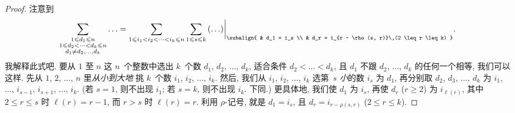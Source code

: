 \begin{proof}
    注意到
    \begin{align*}
        \sum_{\substack{
        1 \leq d_1 \leq n                              \\
        1 \leq d_2 < \dots < d_k \leq n                \\
                d_1 \neq d_2,\dots,d_k
            }} {\dots}
        =
        \sum_{1 \leq i_1 < i_2 < \dots < i_k \leq n}
        { \sum_{1 \leq s \leq k}
        { {({\dots})}\bigg|_{
        \subalign{
         & d_1 = i_s                                   \\
         & d_r = i_{r - \rho(s, r)}\,(2 \leq r \leq k)
        }
        }}}.
    \end{align*}
    我解释此式吧.
    要从 \(1\) 至 \(n\) 这 \(n\)~个整数中选出 \(k\)~个数
    \(d_1\), \(d_2\), \(\dots\), \(d_k\),
    适合条件 \(d_2 < \dots < d_k\),
    且 \(d_1\) 不跟 \(d_2\), \(\dots\), \(d_k\) 的任何一个相等,
    我们可以这样.
    先从 \(1\), \(2\), \(\dots\), \(n\) 里\emph{从小到大地}%
    挑 \(k\)~个数 \(i_1\), \(i_2\), \(\dots\), \(i_k\).
    然后, 我们从 \(i_1\), \(i_2\), \(\dots\), \(i_k\)
    选第~\(s\) \emph{小}的数 \(i_s\) 为 \(d_1\),
    再分别取 \(d_2\), \(d_3\), \(\dots\), \(d_k\)
    为
    \(i_1\), \(\dots\), \(i_{s-1}\),
    \(i_{s+1}\), \(\dots\), \(i_{k}\).
    (若 \(s = 1\), 则不出现 \(i_1\);
    若 \(s = k\), 则不出现 \(i_k\).
    下同.)
    更具体地, 我们使 \(d_1\) 为 \(i_s\),
    再使 \(d_r\) (\(r \geq 2\)) 为 \(i_{\ell (r)}\),
    其中 \(2 \leq r \leq s\) 时 \(\ell (r) = r-1\),
    而 \(r > s\) 时 \(\ell (r) = r\).
    利用 \(\rho\)-记号, 就是 \(d_1 = i_s\),
    且 \(d_r = i_{r - \rho(s, r)}\) (\(2 \leq r \leq k\)).

    \endgroup


\end{proof}
